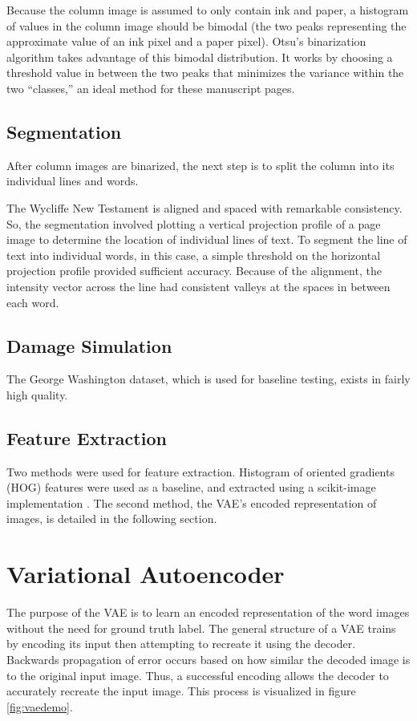 \documentclass[final]{ukthesis}
\begin{document}
Because the column image is assumed to only contain ink and paper, a histogram of values in the column image should be bimodal (the two peaks representing the approximate value of an ink pixel and a paper pixel). Otsu's binarization algorithm \cite{otsu1979threshold} takes advantage of this bimodal distribution. It works by choosing a threshold value in between the two peaks that minimizes the variance within the two ``classes,'' an ideal method for these manuscript pages.


\subsection{Segmentation}
After column images are binarized, the next step is to split the column into its individual lines and words.

The Wycliffe New Testament is aligned and spaced with remarkable consistency. So, the segmentation involved plotting a vertical projection profile of a page image to determine the location of individual lines of text. To segment the line of text into individual words, in this case, a simple threshold on the horizontal projection profile provided sufficient accuracy. Because of the alignment, the intensity vector across the line had consistent valleys at the spaces in between each word.


\subsection{Damage Simulation}
The George Washington dataset, which is used for baseline testing, exists in fairly high quality.


\subsection{Feature Extraction}
Two methods were used for feature extraction. Histogram of oriented gradients (HOG) features were used as a baseline, and extracted using a scikit-image implementation \cite{van2014scikit}. The second method, the VAE's encoded representation of images, is detailed in the following section.



%
%
\section{Variational Autoencoder}

The purpose of the VAE is to learn an encoded representation of the word images without the need for ground truth label. The general structure of a VAE trains by encoding its input then attempting to recreate it using the decoder. Backwards propagation of error occurs based on how similar the decoded image is to the original input image. Thus, a successful encoding allows the decoder to accurately recreate the input image. This process is visualized in figure \ref{fig:vaedemo}.
\end{document}
